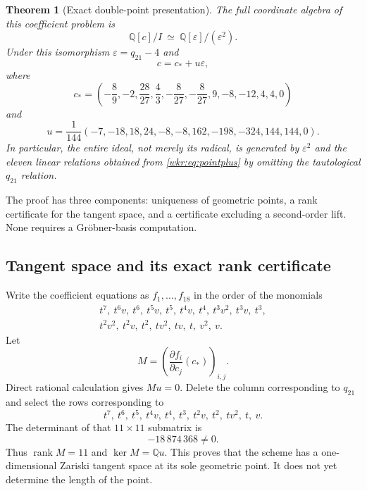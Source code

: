 \documentclass[11pt,a4paper]{article}
\numberwithin{equation}{section}
\newtheorem{theorem}{Theorem}[section]
\theoremstyle{definition}
\theoremstyle{remark}
\newcommand{\Q}{\mathbb{Q}}
\newcommand{\cstar}{c_*}
\newcommand{\eps}{\varepsilon}
\begin{document}
\begin{theorem}[Exact double-point presentation]\label{wkr:thm:double}
The full coordinate algebra of this coefficient problem is
\begin{equation}\label{wkr:eq:dualnumbers}
\Q[c]/I\ \simeq\ \Q[\eps]/(\eps^2).
\end{equation}
Under this isomorphism $\eps=q_{21}-4$ and
\begin{equation}\label{wkr:eq:pointplus}
c=\cstar+u\eps,
\end{equation}
where
\begin{equation}\label{wkr:eq:cstar}
\cstar=\left(-\frac89,-2,\frac{28}{27},\frac43,-\frac8{27},-\frac8{27},
                     9,-8,-12,4,4,0\right)
\end{equation}
and
\begin{equation}\label{wkr:eq:u}
u=\frac1{144}(-7,-18,18,24,-8,-8,162,-198,-324,144,144,0).
\end{equation}
In particular, the entire ideal, not merely its radical, is generated by
$\eps^2$ and the eleven linear relations obtained from
\eqref{wkr:eq:pointplus} by omitting the tautological $q_{21}$ relation.
\end{theorem}

The proof has three components: uniqueness of geometric points, a rank
certificate for the tangent space, and a certificate excluding a
second-order lift. None requires a Gr\"obner-basis computation.

\subsection{Tangent space and its exact rank certificate}

Write the coefficient equations as $f_1,\ldots,f_{18}$ in the order of the
monomials
\begin{equation}\label{wkr:eq:monomialorder}
\begin{gathered}
t^7,\ t^6v,\ t^6,\ t^5v,\ t^5,\ t^4v,\ t^4,\ t^3v^2,\ t^3v,\ t^3,\\
t^2v^2,\ t^2v,\ t^2,\ tv^2,\ tv,\ t,\ v^2,\ v.
\end{gathered}
\end{equation}
Let
\begin{equation}\label{wkr:eq:M}
M=\left(\frac{\partial f_i}{\partial c_j}(\cstar)\right)_{i,j}.
\end{equation}
Direct rational calculation gives $Mu=0$. Delete the column corresponding
to $q_{21}$ and select the rows corresponding to
\begin{equation}\label{wkr:eq:minorrowmonomials}
t^7,\ t^6,\ t^5,\ t^4v,\ t^4,\ t^3,\ t^2v,\ t^2,\ tv^2,\ t,\ v.
\end{equation}
The determinant of that $11\times11$ submatrix is
\begin{equation}\label{wkr:eq:minorvalue}
-18\,874\,368\ne0.
\end{equation}
Thus $\operatorname{rank}M=11$ and $\ker M=\Q u$. This proves that the
scheme has a one-dimensional Zariski tangent space at its sole geometric
point. It does not yet determine the length of the point.
\end{document}
